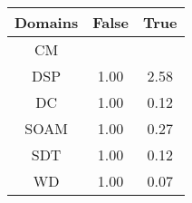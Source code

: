 \begin{tabular}{|c||c|c|}
\hline
Domains & False & True \\ 
\hline
CM &  &  \\ 
\hline
DSP & \cellcolor[rgb]{0.9096314605706095,0.8382555800342184,0.41965602986590217} 1.00 & \cellcolor[rgb]{0.53,0.66,0.42} 2.58 \\ 
\hline
DC & \cellcolor[rgb]{0.9096955450698592,0.8398557845067753,0.42} 1.00 & \cellcolor[rgb]{0.7675313670048178,0.16564847048947107,0.28702927587116334} 0.12 \\ 
\hline
SOAM & \cellcolor[rgb]{0.9097472076187869,0.8398802562404779,0.42} 1.00 & \cellcolor[rgb]{0.791706678337087,0.28007827746221153,0.30959289978128113} 0.27 \\ 
\hline
SDT & \cellcolor[rgb]{0.9096953693874428,0.8398557012887886,0.42} 1.00 & \cellcolor[rgb]{0.767449157024849,0.16525934325095182,0.28695254655652574} 0.12 \\ 
\hline
WD & \cellcolor[rgb]{0.9096794505670404,0.8398481607949138,0.42} 1.00 & \cellcolor[rgb]{0.76,0.13,0.28} 0.07 \\ 
\hline
\end{tabular}